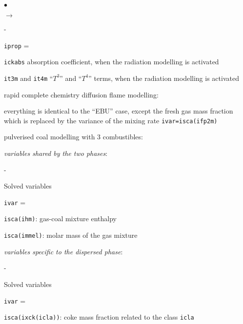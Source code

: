{{{\begin{list}{$\bullet$}{}
\begin{list}{$\rightarrow$}{}
\begin{list}{-}{}
\begin{list}{\texttt{iprop} = }{}
               \item \texttt{ickabs} absorption
                     coefficient, when the radiation modelling is
                     activated
               \item \texttt{it3m} and \texttt{it4m}
                     ``$T^3$'' and ``$T^4$'' terms, when the radiation
                     modelling is activated
              \end{list}
       \end{list}
       \item rapid complete chemistry diffusion flame modelling:
             \begin{list}{}{}
              \item  everything is identical to the ``EBU'' case, except
                     the fresh gas mass fraction which is replaced by the
                     variance of the mixing rate
                     \texttt{ivar=isca(ifp2m)}
             \end{list}
       \item pulverised coal modelling with 3 combustibles:
             \begin{list}{}{}
              \item {\em variables shared by the two phases}:
                    \begin{list}{-}{}
                     \item Solved variables
                           \begin{list}{\texttt{ivar} = }{}
                            \item \texttt{isca(ihm)}: gas-coal
                                  mixture enthalpy
                            \item \texttt{isca(immel)}: molar mass
                                  of the gas mixture
                           \end{list}
                    \end{list}
              \item {\em variables specific to the dispersed phase}:
              \begin{list}{-}{}
               \item Solved variables
                     \begin{list}{\texttt{ivar} = }{}
                      \item \texttt{isca(ixck(icla))}: coke mass
                            fraction related to the class \texttt{icla}

\end{list}
\end{list}
\end{list}
\end{list}
\end{list}}}}
